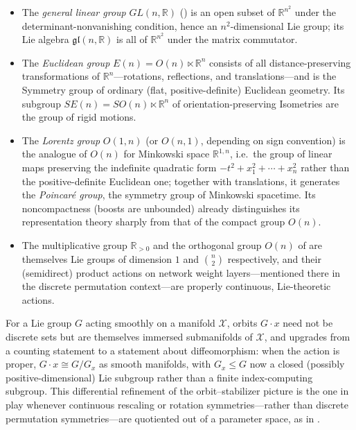 \documentclass[mathematics,review,submit,moreauthors]{Definitions/mdpi}
\begin{document}
\begin{Example}
\label{ex:lie-groups}
\begin{itemize}
    \item The \emph{general linear group} $GL(n,\mathbb{R})$
    () is an open subset of $\mathbb{R}^{n^2}$ under
    the determinant-nonvanishing condition, hence an $n^2$-dimensional Lie
    group; its Lie algebra $\mathfrak{gl}(n,\mathbb{R})$ is all of
    $\mathbb{R}^{n^2}$ under the matrix commutator.
    \item The \emph{Euclidean group} $E(n) = O(n) \ltimes \mathbb{R}^n$
    consists of all distance-preserving transformations of
    $\mathbb{R}^n$---rotations, reflections, and translations---and is the
    Symmetry group of ordinary (flat, positive-definite) Euclidean geometry.
    Its subgroup $SE(n) = SO(n) \ltimes \mathbb{R}^n$ of orientation-preserving
    Isometries are the group of rigid motions.
    \item The \emph{Lorentz group} $O(1,n)$ (or $O(n,1)$, depending on sign
    convention) is the analogue of $O(n)$ for Minkowski space
    $\mathbb{R}^{1,n}$, i.e.\ the group of linear maps preserving the
    indefinite quadratic form $-t^2 + x_1^2 + \cdots + x_n^2$ rather than the
    positive-definite Euclidean one; together with translations, it generates
    the \emph{Poincar\'e group}, the symmetry group of Minkowski spacetime.
    Its noncompactness (boosts are unbounded) already distinguishes its
    representation theory sharply from that of the compact group $O(n)$.
    \item The multiplicative group $\mathbb{R}_{>0}$ and the orthogonal group
    $O(n)$ of  are themselves Lie groups of dimension
    $1$ and $\binom{n}{2}$ respectively, and their (semidirect) product
    actions on network weight layers---mentioned there in the discrete
    permutation context---are properly continuous, Lie-theoretic actions.
\end{itemize}
\end{Example}

For a Lie group $G$ acting smoothly on a manifold $\mathcal{X}$, orbits
$G \cdot x$ need not be discrete sets but are themselves immersed
submanifolds of $\mathcal{X}$, and  upgrades from a
counting statement to a statement about diffeomorphism: when the action is
proper, $G \cdot x \cong G / G_x$ as smooth manifolds, with $G_x \leq G$ now
a closed (possibly positive-dimensional) Lie subgroup rather than a finite
index-computing subgroup. This differential refinement of the
orbit--stabilizer picture is the one in play whenever continuous rescaling
or rotation symmetries---rather than discrete permutation
symmetries---are quotiented out of a parameter space, as in
.
\end{document}
